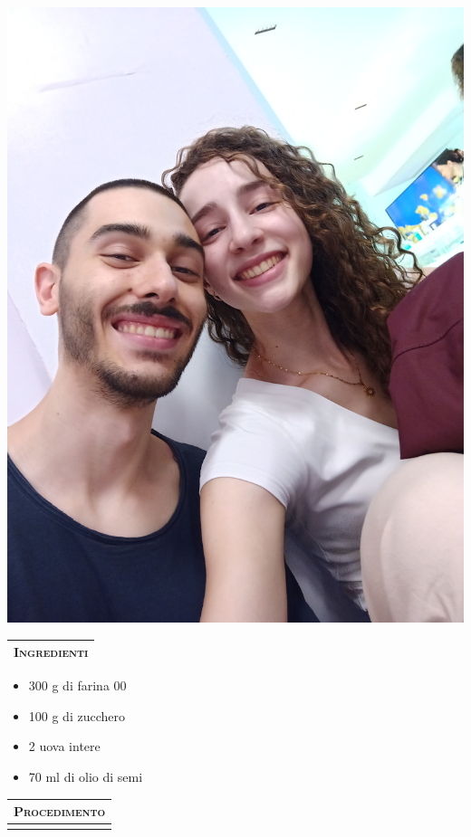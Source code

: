 \documentclass[../../main.tex]{subfiles}
\begin{document}
\noindent
\begin{minipage}[t][\textheight][t]{\textwidth}

    
    \begin{minipage}[t]{0.3\textwidth}
        \includegraphics[valign=t, width=\linewidth]{images/test.jpg}
        \vspace{0.5em}

        \begin{tabularx}{\linewidth}{X}
        {\Large \textsc{Ingredienti}} \\ \hline \hline
        \end{tabularx}

        \begin{itemize}[label={}, left=0pt]
            \item 300 g di farina 00
            \item 100 g di zucchero
            \item 2 uova intere
            \item 70 ml di olio di semi
        \end{itemize}
    \end{minipage}%
    \hfill
    \begin{minipage}[t]{0.65\textwidth}
        \begin{tabularx}{\linewidth}{X}
        \\
        {\Large \textsc{Procedimento}} \\ \hline \hline \\
        \end{tabularx}


\end{minipage}
\end{minipage}
\end{document}
